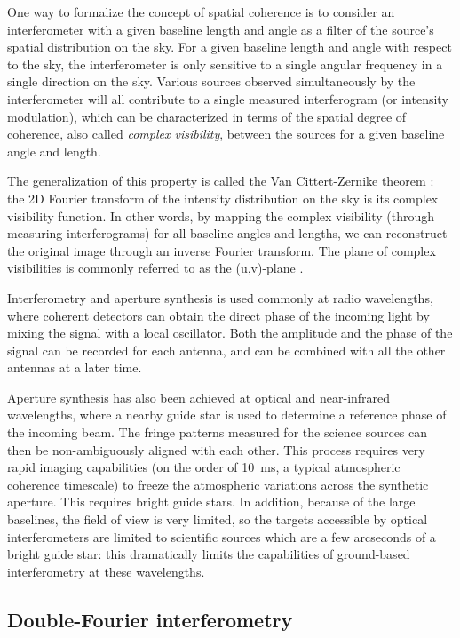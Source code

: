 One way to formalize the concept of spatial coherence is to consider an interferometer with a given baseline length and angle as a filter of the source's spatial distribution on the sky. For a given baseline length and angle with respect to the sky, the interferometer is only sensitive to a single angular frequency in a single direction on the sky. Various sources observed simultaneously by the interferometer will all contribute to a single measured interferogram (or intensity modulation), which can be characterized in terms of the spatial degree of coherence, also called \textit{complex visibility}, between the sources for a given baseline angle and length. 

The generalization of this property is called the Van Cittert-Zernike theorem \citep{Zernike:1938kq}: the 2D Fourier transform of the intensity distribution on the sky is its complex visibility function. In other words, by mapping the complex visibility (through measuring interferograms) for all baseline angles and lengths, we can reconstruct the original image through an inverse Fourier transform. The plane of complex visibilities is commonly referred to as the (u,v)-plane \citep{Thompson:2008ww}.

Interferometry and aperture synthesis is used commonly at radio wavelengths, where coherent detectors can obtain the direct phase of the incoming light by mixing the signal with a local oscillator. Both the amplitude and the phase of the signal can be recorded for each antenna, and can be combined with all the other antennas at a later time.

Aperture synthesis has also been achieved at optical and near-infrared wavelengths, where a nearby guide star is used to determine a reference phase of the incoming beam. The fringe patterns measured for the science sources can then be non-ambiguously aligned with each other. This process requires very rapid imaging capabilities (on the order of \SI{10}{\milli\second}, a typical atmospheric coherence timescale) to freeze the atmospheric variations across the synthetic aperture. This requires bright guide stars. In addition, because of the large baselines, the field of view is very limited, so the targets accessible by optical interferometers are limited to scientific sources which are a few arcseconds of a bright guide star: this dramatically limits the capabilities of ground-based interferometry at these wavelengths.


\subsection{Double-Fourier interferometry}


